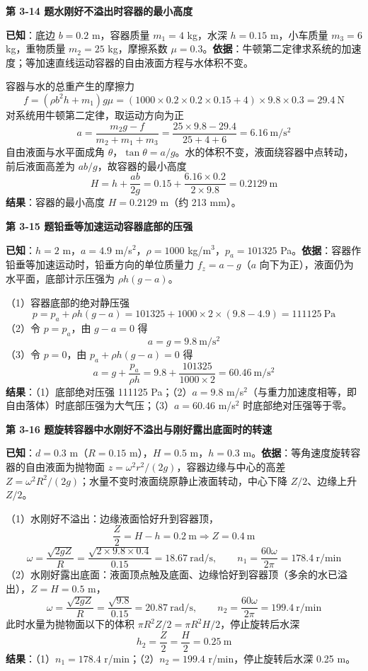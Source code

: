 \noindent\textbf{第 3-14 题\quad 水刚好不溢出时容器的最小高度}

\begin{jie}
\textbf{已知}：底边 $b=0.2$ m，容器质量 $m_1=4$ kg，水深 $h=0.15$ m，小车质量 $m_3=6$ kg，重物质量 $m_2=25$ kg，摩擦系数 $\mu=0.3$。\textbf{依据}：牛顿第二定律求系统的加速度；等加速直线运动容器的自由液面方程与水体积不变。

容器与水的总重产生的摩擦力
\[ f=(\rho b^2h+m_1)g\mu=(1000\times0.2\times0.2\times0.15+4)\times9.8\times0.3=29.4\ \mathrm{N} \]
对系统用牛顿第二定律，取运动方向为正
\[ a=\frac{m_2g-f}{m_2+m_1+m_3}=\frac{25\times9.8-29.4}{25+4+6}=6.16\ \mathrm{m/s^2} \]
自由液面与水平面成角 $\theta$，$\tan\theta=a/g$。水的体积不变，液面绕容器中点转动，前后液面高差为 $ab/g$，故容器的最小高度
\[ H=h+\frac{ab}{2g}=0.15+\frac{6.16\times0.2}{2\times9.8}=0.2129\ \mathrm{m} \]
\textbf{结果}：容器的最小高度 $H=0.2129$ m（约 213 mm）。
\end{jie}

\noindent\textbf{第 3-15 题\quad 铅垂等加速运动容器底部的压强}

\begin{jie}
\textbf{已知}：$h=2$ m，$a=4.9$ m/s$^2$，$\rho=1000$ kg/m$^3$，$p_a=101325$ Pa。\textbf{依据}：容器作铅垂等加速运动时，铅垂方向的单位质量力 $f_z=a-g$（$a$ 向下为正），液面仍为水平面，底部计示压强为 $\rho h(g-a)$。

（1）容器底部的绝对静压强
\[ p=p_a+\rho h(g-a)=101325+1000\times2\times(9.8-4.9)=111125\ \mathrm{Pa} \]
（2）令 $p=p_a$，由 $g-a=0$ 得
\[ a=g=9.8\ \mathrm{m/s^2} \]
（3）令 $p=0$，由 $p_a+\rho h(g-a)=0$ 得
\[ a=g+\frac{p_a}{\rho h}=9.8+\frac{101325}{1000\times2}=60.46\ \mathrm{m/s^2} \]
\textbf{结果}：（1）底部绝对压强 111125 Pa；（2）$a=9.8$ m/s$^2$（与重力加速度相等，即自由落体）时底部压强为大气压；（3）$a=60.46$ m/s$^2$ 时底部绝对压强等于零。
\end{jie}

\noindent\textbf{第 3-16 题\quad 旋转容器中水刚好不溢出与刚好露出底面时的转速}

\begin{jie}
\textbf{已知}：$d=0.3$ m（$R=0.15$ m），$H=0.5$ m，$h=0.3$ m。\textbf{依据}：等角速度旋转容器的自由液面为抛物面 $z=\omega^2r^2/(2g)$，容器边缘与中心的高差 $Z=\omega^2R^2/(2g)$；水量不变时液面绕原静止液面转动，中心下降 $Z/2$、边缘上升 $Z/2$。

（1）水刚好不溢出：边缘液面恰好升到容器顶，
\[ \frac{Z}{2}=H-h=0.2\ \mathrm{m}\Rightarrow Z=0.4\ \mathrm{m} \]
\[ \omega=\frac{\sqrt{2gZ}}{R}=\frac{\sqrt{2\times9.8\times0.4}}{0.15}=18.67\ \mathrm{rad/s},\qquad n_1=\frac{60\omega}{2\pi}=178.4\ \mathrm{r/min} \]
（2）水刚好露出底面：液面顶点触及底面、边缘恰好到容器顶（多余的水已溢出），$Z=H=0.5$ m，
\[ \omega=\frac{\sqrt{2gZ}}{R}=\frac{\sqrt{9.8}}{0.15}=20.87\ \mathrm{rad/s},\qquad n_2=\frac{60\omega}{2\pi}=199.4\ \mathrm{r/min} \]
此时水量为抛物面以下的体积 $\pi R^2Z/2=\pi R^2H/2$，停止旋转后水深
\[ h_2=\frac{Z}{2}=\frac{H}{2}=0.25\ \mathrm{m} \]
\textbf{结果}：（1）$n_1=178.4$ r/min；（2）$n_2=199.4$ r/min，停止旋转后水深 0.25 m。
\end{jie}

